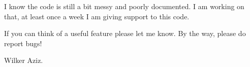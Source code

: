 

I know the code is still a bit messy and poorly documented. 
I am working on that, at least once a week I am giving support to this code. 

If you can think of a useful feature please let me know. By the way, please do report bugs!

\vspace{3cm}
\hspace{12cm}
Wilker Aziz.